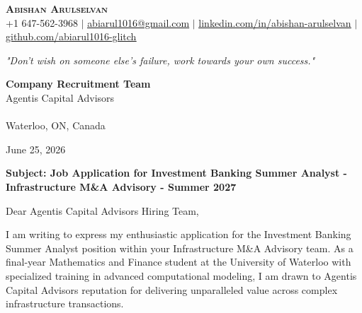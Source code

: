 \documentclass[letterpaper,11pt]{article}
\begin{document}
\begin{center}
    {\Huge \scshape \textbf{Abishan Arulselvan}} \\ \vspace{6pt}
    \small +1 647-562-3968 $|$ 
    \href{abiarul1016@gmail.com}{\underline{abiarul1016@gmail.com}} $|$ 
    \href{https://www.linkedin.com/in/abishan-arulselvan/}{\underline{linkedin.com/in/abishan-arulselvan}} $|$
    \href{https://github.com/abiarul1016-glitch}{\underline{github.com/abiarul1016-glitch}}
    
    \vspace{10pt}
    \textit{"Don't wish on someone else's failure, work towards your own success."}
\end{center}

\vspace{0.5em}

\begin{flushleft}
    \setlength{\parindent}{0pt} %
    \textbf{Company Recruitment Team} \\
    \vspace{0.5em}
    Agentis Capital Advisors \\
     \\
    Waterloo, ON, Canada
\end{flushleft}

\vspace{1em}

{\setlength{\parindent}{0pt} June 25, 2026 \par}

\vspace{1em}

{\setlength{\parindent}{0pt} \textbf{Subject: Job Application for Investment Banking Summer Analyst - Infrastructure M&A Advisory - Summer 2027} \par}

\vspace{1em}

{\setlength{\parindent}{0pt} Dear Agentis Capital Advisors Hiring Team, \par}

\vspace{0.5em}

I am writing to express my enthusiastic application for the Investment Banking Summer Analyst position within your Infrastructure M&A Advisory team. As a final-year Mathematics and Finance student at the University of Waterloo with specialized training in advanced computational modeling, I am drawn to Agentis Capital Advisors reputation for delivering unparalleled value across complex infrastructure transactions.
\end{document}
